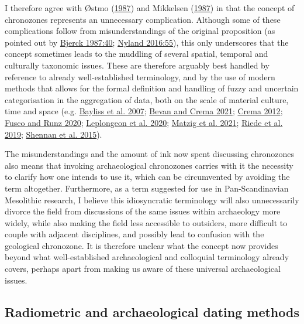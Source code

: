 \documentclass[
  12pt,
  a4paper,
  oneside]{book}
\begin{document}
I therefore agree with Østmo (\protect\hyperlink{ref-uxf8stmo1987}{1987}) and Mikkelsen (\protect\hyperlink{ref-mikkelsen1987}{1987}) in that the concept of chronozones represents an unnecessary complication. Although some of these complications follow from misunderstandings of the original proposition (as pointed out by \protect\hyperlink{ref-bjerck1987}{Bjerck 1987:40}; \protect\hyperlink{ref-nyland2016}{Nyland 2016:55}), this only underscores that the concept sometimes leads to the muddling of several spatial, temporal and culturally taxonomic issues. These are therefore arguably best handled by reference to already well-established terminology, and by the use of modern methods that allows for the formal definition and handling of fuzzy and uncertain categorisation in the aggregation of data, both on the scale of material culture, time and space (e.g. \protect\hyperlink{ref-bayliss2007}{Bayliss et al. 2007}; \protect\hyperlink{ref-bevan2021}{Bevan and Crema 2021}; \protect\hyperlink{ref-crema2012}{Crema 2012}; \protect\hyperlink{ref-fusco2020}{Fusco and Runz 2020}; \protect\hyperlink{ref-leplongeon2020}{Leplongeon et al. 2020}; \protect\hyperlink{ref-matzig2021}{Matzig et al. 2021}; \protect\hyperlink{ref-riede2019}{Riede et al. 2019}; \protect\hyperlink{ref-shennan2015}{Shennan et al. 2015}).

The misunderstandings and the amount of ink now spent discussing chronozones also means that invoking archaeological chronozones carries with it the necessity to clarify how one intends to use it, which can be circumvented by avoiding the term altogether. Furthermore, as a term suggested for use in Pan-Scandinavian Mesolithic research, I believe this idiosyncratic terminology will also unnecessarily divorce the field from discussions of the same issues within archaeology more widely, while also making the field less accessible to outsiders, more difficult to couple with adjacent disciplines, and possibly lead to confusion with the geological chronozone. It is therefore unclear what the concept now provides beyond what well-established archaeological and colloquial terminology already covers, perhaps apart from making us aware of these universal archaeological issues.

\hypertarget{radiometric-and-archaeological-dating-methods}{%
\subsection{Radiometric and archaeological dating methods}\label{radiometric-and-archaeological-dating-methods}}
\end{document}
